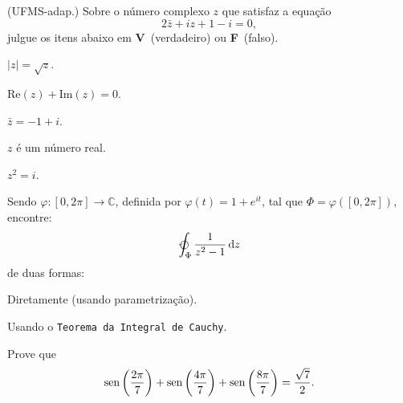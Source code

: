 \documentclass{ativmatUFRB}
\begin{document}
\begin{atividade}
\questao (UFMS-adap.) Sobre o número complexo $z$ que satisfaz a equação 
\[
 2 \bar{z} + iz + 1 - i = 0,
\]
julgue os itens abaixo em \textbf{V}~(verdadeiro) ou \textbf{F}~(falso).
\begin{multicols}{3}
 \begin{itens}[\vf]
  \item $\displaystyle \left|z\right|=\sqrt{z}$.
  \item $\displaystyle \textrm{Re}\left(z\right)+\textrm{Im}\left(z\right)=0$.
  \item $\displaystyle \bar{z} = -1 + i$.
  \item $\displaystyle z$ é um número real.
  \item $\displaystyle z^{2} = i$.
 \end{itens}
\end{multicols}

\questao Sendo $\varphi\colon [0,2\pi]\to\mathbb{C}$, definida por 
$ \varphi(t) = 1 + e^{it} $, tal que $ \Phi = \varphi\left([0,2\pi]\right) $, 
encontre:
\[
 \intc_{\Phi}\frac{1}{z^2-1} \dd{z} %
\]
de duas formas:
\begin{itens}
 \item Diretamente (usando parametrização).
 \item Usando o \texttt{Teorema da Integral de Cauchy}.
\end{itens} 

\questao Prove que
\[
  \operatorname{sen}{\left(\frac{2\pi}{7}\right)} + 
  \operatorname{sen}{\left(\frac{4\pi}{7}\right)} + 
  \operatorname{sen}{\left(\frac{8\pi}{7}\right)} =
  \frac{\sqrt{7}}{2}.
\]
%
\end{atividade}
%
\end{document}
